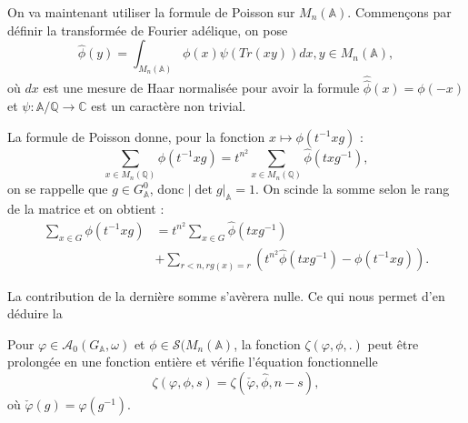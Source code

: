 On va maintenant utiliser la formule de Poisson sur $M_n(\mathbb{A})$. Commençons par définir la transformée de Fourier adélique, on pose
\begin{equation}
\hat{\phi}(y) = \int_{M_n(\mathbb{A})} \phi(x)\psi(Tr(xy))dx, y \in M_n(\mathbb{A}),
\end{equation}
où $dx$ est une mesure de Haar normalisée pour avoir la formule $\hat{\hat{\phi}}(x)=\phi(-x)$ et $\psi : \mathbb{A}/\mathbb{Q} \rightarrow \mathbb{C}$ est un caractère non trivial.

La formule de Poisson donne, pour la fonction $x \mapsto \phi(t^{-1}xg)$ :
\begin{equation}
\sum_{x \in M_n(\mathbb{Q})} \phi(t^{-1}xg) = t^{n^2}\sum_{x \in M_n(\mathbb{Q})} \hat{\phi}(txg^{-1}),
\end{equation}
on se rappelle que $g \in G^0_\mathbb{A}$, donc $|\det g|_\mathbb{A}=1$. On scinde la somme selon le rang de la matrice et on obtient :
\begin{equation}
\begin{split}
\sum_{x \in G} \phi(t^{-1}xg) &= t^{n^2}\sum_{x \in G} \hat{\phi}(txg^{-1}) \\
&+ \sum_{r < n, rg(x)=r} \left( t^{n^2}\hat{\phi}(txg^{-1}) - \phi(t^{-1}xg)\right).
\end{split}
\end{equation}

La contribution de la dernière somme s'avèrera nulle. Ce qui nous permet d'en déduire la
\begin{proposition}
Pour $\varphi \in \mathcal{A}_0(G_\mathbb{A}, \omega)$ et $\phi \in \mathcal{S}(M_n(\mathbb{A})$, la fonction $\zeta(\varphi, \phi, .)$ peut être prolongée en une fonction entière et vérifie l'équation fonctionnelle
\begin{equation}
\label{eqcusp}
\zeta(\varphi, \phi, s) = \zeta(\check{\varphi}, \hat{\phi}, n-s),
\end{equation}
où $\check{\varphi}(g)=\varphi(g^{-1})$.
\end{proposition}

